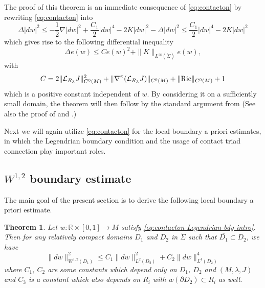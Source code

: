 \documentclass[reqno]{amsart}
\def\R{\ifmmode{\mathbb R}\else{$\mathbb R$}\fi} %
\newcommand{\del}{\partial}
\newcommand{\be}{\begin{equation}}
\newcommand{\ee}{\end{equation}}
\theoremstyle{theorem}
\newtheorem{thm}{Theorem}[section]
\theoremstyle{definition}
\numberwithin{equation}{section}
\def\R{{\mathbb R}}
\def\R{{\mathbb R}}
\def\R{\ifmmode{\mathbb R}\else{$\mathbb R$}\fi} %
\def\R{{\mathbb R}}
\def\R{{\mathbb R}}
\def\CL{{\mathcal L}}
\begin{document}
The proof of this theorem is an immediate consequence of \eqref{eq:contacton}
by rewriting \eqref{eq:contacton} into
$$
\Delta |dw|^2 \leq - \frac12 \nabla |dw|^2 + \frac{C_1}{2} |dw|^4 - 2K |dw|^2 - \Delta |dw|^2
\leq  \frac{C_1}{2} |dw|^4 - 2K |dw|^2
$$
which gives rise to the following differential inequality
$$
\Delta e(w)\leq Ce(w)^2+\|K\|_{L^\infty(\dot\Sigma)}e(w),
$$
with
$$
C=2\|\CL_{R_\lambda}J\|^2_{C^0(M)}+\|\nabla^\pi(\CL_{R_\lambda}J)\|_{C^0(M)}+\|\text{\rm Ric}\|_{C^0(M)}+1
$$
which is a positive constant independent of $w$. By considering it on a sufficiently small domain,
the theorem will then follow by the standard argument
from \cite{schoen} (See also the proof of \cite[Theorem 8.13]{oh:book1} and
 \cite[Theorem 5.1]{oh-wang:CR-map1}.)

Next we will again utilize \eqref{eq:contacton} for the local
boundary a priori estimates, in which the Legendrian boundary condition
and the usage of contact triad connection play important roles.

\subsection{$W^{1,2}$ boundary estimate}

The main goal of the present section is to derive the following local boundary a priori estimate.

\begin{thm}\label{thm:local-W12} Let $w: \R \times [0,1] \to M$ satisfy \eqref{eq:contacton-Legendrian-bdy-intro}.
Then for any relatively compact domains $D_1$ and $D_2$ in
$\dot\Sigma$ such that $\overline{D_1}\subset D_2$, we have
\be\label{eq:without-bdyterm}
\|dw\|^2_{W^{1,2}(D_1)}\leq C_1 \|dw\|^2_{L^2(D_2)} + C_2 \|dw\|^4_{L^4(D_2)}
\ee
where $C_1, \ C_2$ are some constants which
depend only on $D_1$, $D_2$ and $(M,\lambda, J)$ and $C_3$ is a
constant which also depends on $R_i$ with $w(\del D_2) \subset R_i$ as well.
\end{thm}
\end{document}
